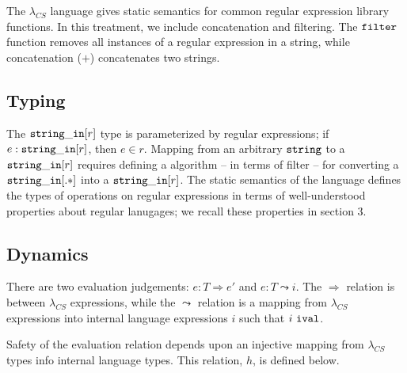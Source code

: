 \documentclass[10pt,preprint]{sigplanconf}
\theoremstyle{definition}
\newcommand{\strin}{{\tt string\_in}}
\newcommand{\str}{ {\tt string} }
\newcommand{\reduces}{ \Rightarrow }
\newcommand{\ireduces}{ \leadsto }
\newcommand{\ival}{ \ {\tt ival} }
\newcommand{\lcs}{\lambda_{CS}}
\begin{document}
The $\lcs$ language gives static semantics for common regular expression library
functions. In this treatment, we include concatenation and filtering.
The ${\tt filter}$ function removes all instances of a regular expression in a string,
while concatenation ($+$) concatenates two strings.

\subsection{Typing}

The $\strin[r]$ type is parameterized by regular expressions; if $e:\strin[r]$,
then $e \in r$. Mapping from an arbitrary $\str$ to a $\strin[r]$ requires
defining a algorithm -- in terms of filter -- for converting a $\strin[.*]$
into a $\strin[r]$. The static semantics of the language defines the types of
operations on regular expressions in terms of well-understood properties about
regular lanugages; we recall these properties in section 3.

\subsection{Dynamics}

There are two evaluation judgements: $e:T \reduces e'$ and $e:T \ireduces i$.
The $\reduces$ relation is between $\lcs$ expressions, while the $\ireduces$
relation is a mapping from $\lcs$ expressions into internal language expressions
$i$ such that $i \ival$.

Safety of the evaluation relation depends upon an injective mapping from $\lcs$ types info
internal language types. This relation, $h$, is defined below.
\end{document}
